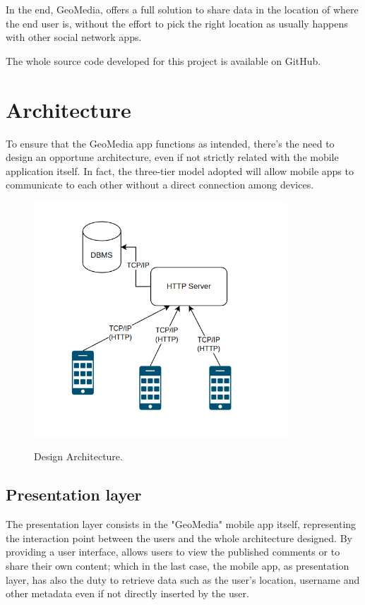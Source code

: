 \documentclass[conference]{IEEEtran}
\begin{document}
In the end, GeoMedia, offers a full solution to share data in the location of where the end user is, without the effort to pick the right location as usually happens with other social network apps.

The whole source code developed for this project is available on GitHub. \cite{gh}


\section{Architecture}

To ensure that the GeoMedia app functions as intended, there's the need to design an opportune architecture, even if not strictly related with the mobile application itself.
In fact, the three-tier model adopted will allow mobile apps to communicate to each other without a direct connection among devices.

\begin{figure}[htbp]
{\includegraphics[width=9.5cm]{imgs/Architecture.png}}
\caption{Design Architecture.}
\label{fig}
\end{figure}

\subsection{Presentation layer}
The presentation layer consists in the "GeoMedia" mobile app itself, representing the interaction point between the users and the whole architecture designed.
By providing a user interface, allows users to view the published comments or to share their own content; which in the last case, the mobile app, as presentation layer, has also the duty to retrieve data such as the user's location, username and other metadata even if not directly inserted by the user.
\end{document}
